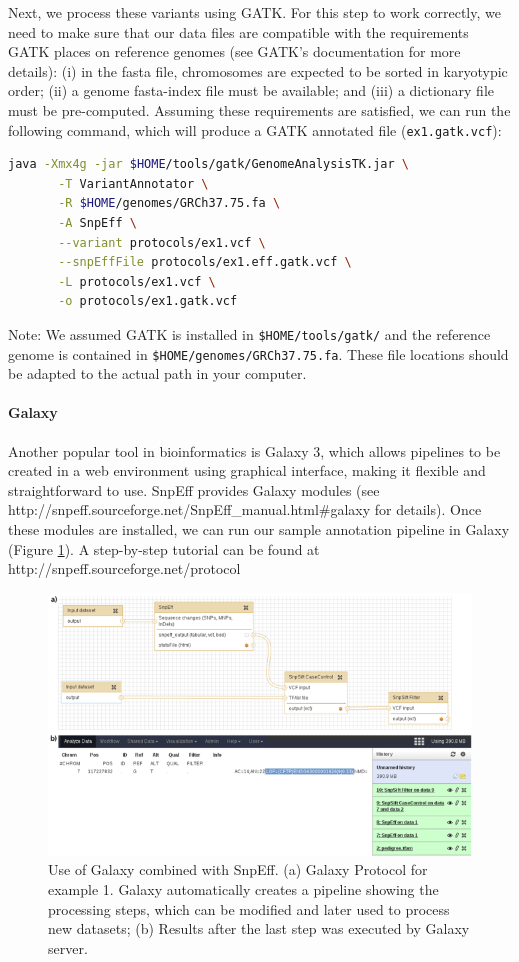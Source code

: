 Next, we process these variants using GATK. For this step to work correctly, we need to make sure that our data files are compatible with the requirements GATK places on reference genomes (see GATK’s documentation for more details): (i) in the fasta file, chromosomes are expected to be sorted in karyotypic order; (ii) a genome fasta-index file must be available; and (iii) a dictionary file must be pre-computed. Assuming these requirements are satisfied, we can run the following command, which will produce a GATK annotated file (\texttt{ex1.gatk.vcf}):

\begin{lstlisting}[language=bash]
java -Xmx4g -jar $HOME/tools/gatk/GenomeAnalysisTK.jar \
       -T VariantAnnotator \
       -R $HOME/genomes/GRCh37.75.fa \
       -A SnpEff \
       --variant protocols/ex1.vcf \
       --snpEffFile protocols/ex1.eff.gatk.vcf \
       -L protocols/ex1.vcf \
       -o protocols/ex1.gatk.vcf
\end{lstlisting}

Note: We assumed GATK is installed in \texttt{\$HOME/tools/gatk/} and the reference genome is contained in \texttt{\$HOME/genomes/GRCh37.75.fa}. These file locations should be adapted to the actual path in your computer.

\paragraph{Galaxy} Another popular tool in bioinformatics is Galaxy 3, which allows pipelines to be created in a web environment using graphical interface, making it flexible and straightforward to use. SnpEff provides Galaxy modules (see http://snpeff.sourceforge.net/SnpEff\_manual.html\#galaxy for details). Once these modules are installed, we can run our sample annotation pipeline in Galaxy (Figure \ref{fig:snpeff3}). A step-by-step tutorial can be found at http://snpeff.sourceforge.net/protocol

\begin{figure}
    \centering
    \includegraphics[width=14cm]{snpeff_3.png}
    \caption{Use of Galaxy combined with SnpEff. (a) Galaxy Protocol for example 1. Galaxy automatically creates a pipeline showing the processing steps, which can be modified and later used to process new datasets; (b) Results after the last step was executed by Galaxy server.}
    \label{fig:snpeff3}
\end{figure}

